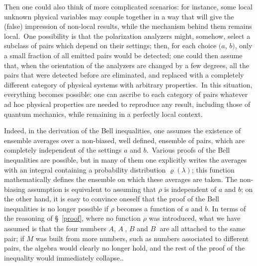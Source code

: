 \documentclass[12pt,onecolumn]{article}%
\begin{document}
Then one could also think of more complicated scenarios: for instance, some
local unknown physical variables may couple together in a way that will give
the (false) impression of non-local results, while the mechanism behind them
remains local.\ One possibility is that the polarization analyzers might,
somehow, select a subclass of pairs which depend on their settings; then, for
each choice $(a$, $b)$, only a small fraction of all emitted pairs would be
detected; one could then assume that, when the orientation of the analyzers
are changed by a few degrees, all the pairs that were detected before are
eliminated, and replaced with a completely different category of physical
systems with arbitrary properties.\ In this situation, everything becomes
possible: one can ascribe to each category of pairs whatever ad hoc physical
properties are needed to reproduce any result, including those of quantum
mechanics, while remaining in a perfectly local context.

Indeed, in the derivation of the Bell inequalities, one assumes the existence
of ensemble averages over a non-biased, well defined, ensemble of pairs, which
are completely independent of the settings $a$ and $b$.\ Various proofs of the
Bell inequalities are possible, but in many of them one explicitly writes the
averages with an integral containing a probability distribution $\varrho
(\lambda)$; this function mathematically defines the ensemble on which these
averages are taken. The non-biasing assumption is equivalent to assuming that
$\rho$ is independent of $a$ and $b$; on the other hand, it is easy to
convince oneself that the proof of the Bell inequalities is no longer possible
if $\rho$ becomes a function of $a$ and $b$. In terms of the reasoning of
\S \ \ref{proof}, where no function $\rho$ was introduced, what we have
assumed is that the four numbers $A$, $A^{^{\prime}}$, $B$ and $B^{^{\prime}}$
are all attached to the same pair; if $M$ was built from more numbers, such as
numbers associated to different pairs, the algebra would clearly no longer
hold, and the rest of the proof of the inequality would immediately collapse..
\end{document}
